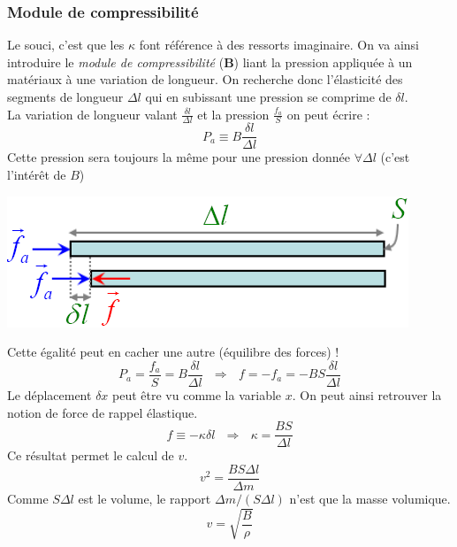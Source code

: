 \documentclass	[11pt, a4paper, openany]{book}
\begin{document}
		\subsubsection{Module de compressibilité}
		Le souci, c'est que les $\kappa$ font référence à des ressorts imaginaire. On va ainsi introduire le \textit{module de compressibilité} (\textbf{B}) liant la pression appliquée à un matériaux à une variation de longueur. On recherche donc l'élasticité des segments de longueur $\Delta l$ qui en subissant une pression se comprime de $\delta l$. \\
		La variation de longueur valant $\frac{\delta l}{\Delta l}$ et la pression $\frac{f_a}{S}$ on peut écrire :
		\begin{equation}
			P_a \equiv B\frac{\delta l}{\Delta l}
		\end{equation}
		Cette pression sera toujours la même pour une pression donnée $\forall \Delta l$ (c'est l'intérêt de $B$)
		\begin{center}
			\includegraphics[scale=0.4]{oo/image28.png}
		\end{center}
		Cette égalité peut en cacher une autre (équilibre des forces) ! 
		\begin{equation}
			P_a = \frac{f_a}{S} = B\frac{\delta l}{\Delta l}\ \ \ \Rightarrow\ \ \ f = -f_a = -BS\frac{\delta l}{\Delta l}
		\end{equation}
		Le déplacement $\delta x$ peut être vu comme la variable $x$. On peut ainsi retrouver la notion de force de rappel élastique.
		\begin{equation}
			f \equiv -\kappa \delta l\ \ \ \Rightarrow\ \ \ \kappa = \frac{BS}{\Delta l}
		\end{equation}
		Ce résultat permet le calcul de $v$.
		\begin{equation}
			v^2 = \frac{BS\Delta l}{\Delta m}
		\end{equation}
		Comme $S\Delta l$ est le volume, le rapport $\Delta m /(S\Delta l)$ n'est que la masse volumique.
		\begin{equation}
			v = \sqrt{\frac{B}{\rho}}
		\end{equation}
		
\end{document}
